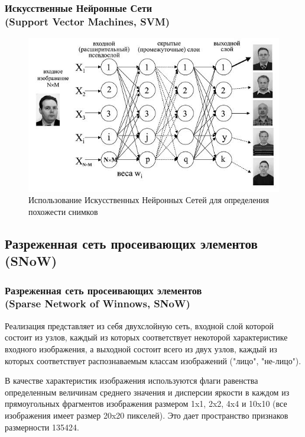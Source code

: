 \documentclass{beamer}
\begin{document}
\begin{frame}
\frametitle{Искусственные Нейронные Сети\\(Support Vector Machines, SVM)}

\begin{figure}
\includegraphics[scale=0.65]{res/img07}
\caption{Использование Искусственных Нейронных Сетей для определения похожести снимков}
\end{figure}

\end{frame}

\subsection{Разреженная сеть просеивающих элементов (SNoW)}

\begin{frame}
\frametitle{Разреженная сеть просеивающих элементов\\(Sparse Network of Winnows, SNoW)}

Реализация представляет из себя двухслойную сеть, входной слой которой состоит из узлов, каждый из которых соответствует некоторой характеристике входного изображения, а выходной состоит всего из двух узлов, каждый из которых соответствует распознаваемым классам изображений ("лицо", "не-лицо").
\bigskip

В качестве характеристик изображения используются флаги равенства определенным величинам среднего значения и дисперсии яркости в каждом из прямоугольных фрагментов изображения размером 1x1, 2x2, 4x4 и 10x10 (все изображения имеет размер 20x20 пикселей). Это дает пространство признаков размерности 135424.

\end{frame}
\end{document}
